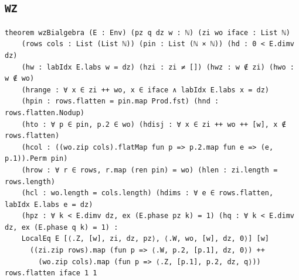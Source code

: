 \subsection{\texttt{WZ}}
\begin{lstlisting}[style=leancore]
theorem wzBialgebra (E : Env) (pz q dz w : ℕ) (zi wo iface : List ℕ)
    (rows cols : List (List ℕ)) (pin : List (ℕ × ℕ)) (hd : 0 < E.dimv dz)
    (hw : labIdx E.labs w = dz) (hzi : zi ≠ []) (hwz : w ∉ zi) (hwo : w ∉ wo)
    (hrange : ∀ x ∈ zi ++ wo, x ∈ iface ∧ labIdx E.labs x = dz)
    (hpin : rows.flatten = pin.map Prod.fst) (hnd : rows.flatten.Nodup)
    (hto : ∀ p ∈ pin, p.2 ∈ wo) (hdisj : ∀ x ∈ zi ++ wo ++ [w], x ∉ rows.flatten)
    (hcol : ((wo.zip cols).flatMap fun p => p.2.map fun e => (e, p.1)).Perm pin)
    (hrow : ∀ r ∈ rows, r.map (ren pin) = wo) (hlen : zi.length = rows.length)
    (hcl : wo.length = cols.length) (hdims : ∀ e ∈ rows.flatten, labIdx E.labs e = dz)
    (hpz : ∀ k < E.dimv dz, ex (E.phase pz k) = 1) (hq : ∀ k < E.dimv dz, ex (E.phase q k) = 1) :
    LocalEq E [⟨.Z, [w], zi, dz, pz⟩, ⟨.W, wo, [w], dz, 0⟩] [w]
      ((zi.zip rows).map (fun p => ⟨.W, p.2, [p.1], dz, 0⟩) ++
        (wo.zip cols).map (fun p => ⟨.Z, [p.1], p.2, dz, q⟩)) rows.flatten iface 1 1
\end{lstlisting}

